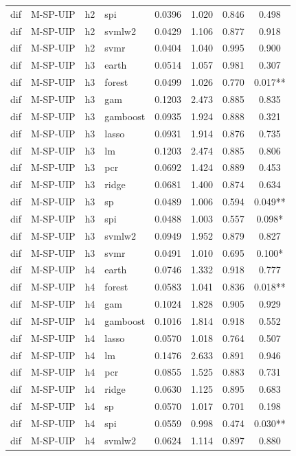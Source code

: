 \begin{ThreePartTable}
\begin{longtable}[t]{llclcccc}
dif & M-SP-UIP & h2 & spi & 0.0396 & 1.020 & 0.846 & 0.498\\
dif & M-SP-UIP & h2 & svmlw2 & 0.0429 & 1.106 & 0.877 & 0.918\\
dif & M-SP-UIP & h2 & svmr & 0.0404 & 1.040 & 0.995 & 0.900\\
\addlinespace
dif & M-SP-UIP & h3 & earth & 0.0514 & 1.057 & 0.981 & 0.307\\
dif & M-SP-UIP & h3 & forest & 0.0499 & 1.026 & 0.770 & 0.017**\\
dif & M-SP-UIP & h3 & gam & 0.1203 & 2.473 & 0.885 & 0.835\\
dif & M-SP-UIP & h3 & gamboost & 0.0935 & 1.924 & 0.888 & 0.321\\
dif & M-SP-UIP & h3 & lasso & 0.0931 & 1.914 & 0.876 & 0.735\\
dif & M-SP-UIP & h3 & lm & 0.1203 & 2.474 & 0.885 & 0.806\\
dif & M-SP-UIP & h3 & pcr & 0.0692 & 1.424 & 0.889 & 0.453\\
dif & M-SP-UIP & h3 & ridge & 0.0681 & 1.400 & 0.874 & 0.634\\
dif & M-SP-UIP & h3 & sp & 0.0489 & 1.006 & 0.594 & 0.049**\\
dif & M-SP-UIP & h3 & spi & 0.0488 & 1.003 & 0.557 & 0.098*\\
dif & M-SP-UIP & h3 & svmlw2 & 0.0949 & 1.952 & 0.879 & 0.827\\
dif & M-SP-UIP & h3 & svmr & 0.0491 & 1.010 & 0.695 & 0.100*\\
\addlinespace
dif & M-SP-UIP & h4 & earth & 0.0746 & 1.332 & 0.918 & 0.777\\
dif & M-SP-UIP & h4 & forest & 0.0583 & 1.041 & 0.836 & 0.018**\\
dif & M-SP-UIP & h4 & gam & 0.1024 & 1.828 & 0.905 & 0.929\\
dif & M-SP-UIP & h4 & gamboost & 0.1016 & 1.814 & 0.918 & 0.552\\
dif & M-SP-UIP & h4 & lasso & 0.0570 & 1.018 & 0.764 & 0.507\\
dif & M-SP-UIP & h4 & lm & 0.1476 & 2.633 & 0.891 & 0.946\\
dif & M-SP-UIP & h4 & pcr & 0.0855 & 1.525 & 0.883 & 0.731\\
dif & M-SP-UIP & h4 & ridge & 0.0630 & 1.125 & 0.895 & 0.683\\
dif & M-SP-UIP & h4 & sp & 0.0570 & 1.017 & 0.701 & 0.198\\
dif & M-SP-UIP & h4 & spi & 0.0559 & 0.998 & 0.474 & 0.030**\\
dif & M-SP-UIP & h4 & svmlw2 & 0.0624 & 1.114 & 0.897 & 0.880\\

\end{longtable}
\end{ThreePartTable}
